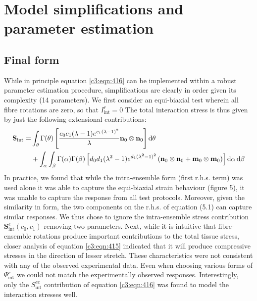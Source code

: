 \section{Model simplifications and parameter estimation}

\subsection{Final form}

    While in principle equation \ref{c3:eqn:416} can be implemented within a robust parameter estimation procedure, simplifications are clearly in order given its complexity (14 parameters). We first consider an equi-biaxial test wherein all fibre rotations are zero, so that $I_\mathrm{int}^r = 0$ The total interaction stress is thus given by just the following extensional contributions:
        \begin{equation}\label{c3:eqn:51}
        \begin{aligned}
        \mathbf{S}_\mathrm{int} =&\int_\theta \Gamma(\theta)\left[\frac{c_0c_1(\lambda-1)e^{c_1(\lambda-1)^2}}{\lambda}\mathbf{n}_0\otimes\mathbf{n}_0\right]\dif \theta  \\
        &+ \int_\alpha\int_\beta \Gamma(\alpha)\Gamma(\beta)\left[d_0d_1(\lambda^2-1)e^{d_1(\lambda^2-1)^2}\left(\mathbf{n}_0\otimes\mathbf{n}_0 + \mathbf{m}_0\otimes\mathbf{m}_0\right)\right]\dif\alpha\dif\beta
        \end{aligned}
        \end{equation}
    In practice, we found that while the intra-ensemble form (first r.h.s. term) was used alone it was able to capture the equi-biaxial strain behaviour (figure 5), it was unable to capture the response from all test protocols. Moreover, given the similarity in form, the two components on the r.h.s. of equation (5.1) can capture similar responses. We thus chose to ignore the intra-ensemble stress contribution $\mathbf{S}_\mathrm{int}^e(c_0,c_1)$ removing two parameters. Next, while it is intuitive that fibre-ensemble rotations produce important contributions to the total tissue stress, closer analysis of equation \ref{c3:eqn:415} indicated that it will produce compressive stresses in the direction of lesser stretch. These characteristics were not consistent with any of the observed experimental data. Even when choosing various forms of $\Psi_\mathrm{int}^r$ we could not match the experimentally observed responses. Interestingly, only the $S_\mathrm{int}^{ee}$ contribution of equation \ref{c3:eqn:416} was found to model the interaction stresses well.
    
